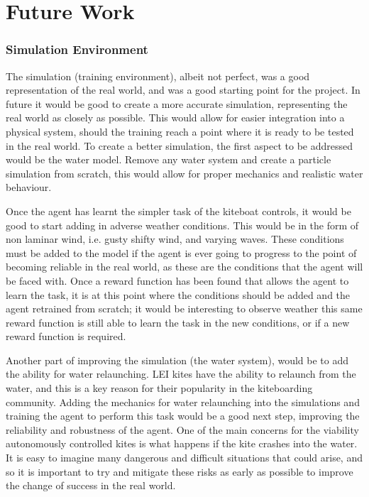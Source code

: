 

\let\textcircled=\pgftextcircled\chapter{Future Work}\label{chap:future_work}

\subsection*{Simulation Environment}

The simulation (training environment), albeit not perfect, was a good representation of the real world, and was a good starting point for the project. In future it would be good to create a more accurate simulation, representing the real world as closely as possible. This would allow for easier integration into a physical system, should the training reach a point where it is ready to be tested in the real world. To create a better simulation, the first aspect to be addressed would be the water model. Remove any water system and create a particle simulation from scratch, this would allow for proper mechanics and realistic water behaviour.

Once the agent has learnt the simpler task of the kiteboat controls, it would be good to start adding in adverse weather conditions. This would be in the form of non laminar wind, i.e. gusty shifty wind, and varying waves. These conditions must be added to the model if the agent is ever going to progress to the point of becoming reliable in the real world, as these are the conditions that the agent will be faced with. Once a reward function has been found that allows the agent to learn the task, it is at this point where the conditions should be added and the agent retrained from scratch; it would be interesting to observe weather this same reward function is still able to learn the task in the new conditions, or if a new reward function is required.

Another part of improving the simulation (the water system), would be to add the ability for water relaunching. LEI kites have the ability to relaunch from the water, and this is a key reason for their popularity in the kiteboarding community. Adding the mechanics for water relaunching into the simulations and training the agent to perform this task would be a good next step, improving the reliability and robustness of the agent. One of the main concerns for the viability autonomously controlled kites is what happens if the kite crashes into the water. It is easy to imagine many dangerous and difficult situations that could arise, and so it is important to try and mitigate these risks as early as possible to improve the change of success in the real world. 


